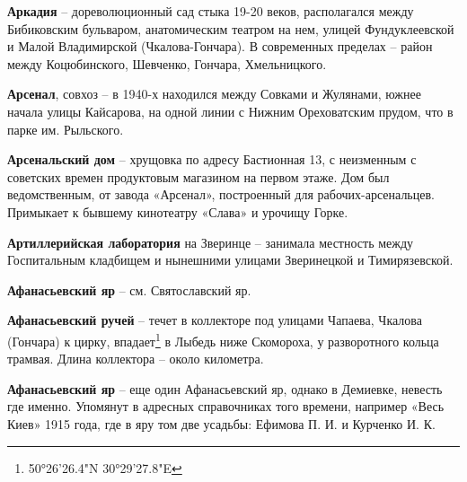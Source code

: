 \medskip


\textbf{Аркадия} – дореволюционный сад стыка 19-20 веков, располагался между Бибиковским бульваром, анатомическим театром на нем, улицей Фундуклеевской и Малой Владимирской (Чкалова-Гончара). В современных пределах – район между Коцюбинского, Шевченко, Гончара, Хмельницкого.\\ 

\medskip


\textbf{Арсенал}, совхоз – в 1940-х находился между Совками и Жулянами, южнее начала улицы Кайсарова, на одной линии с Нижним Ореховатским прудом, что в парке им. Рыльского.\\

\medskip


\textbf{Арсенальский дом} – хрущовка по адресу Бастионная 13, с неизменным с советских времен продуктовым магазином на первом этаже. Дом был ведомственным, от завода «Арсенал», построенный для рабочих-арсенальцев. Примыкает к бывшему кинотеатру «Слава» и урочищу Горке.\\

\medskip


\textbf{Артиллерийская лаборатория} на Зверинце – занимала местность между Госпитальным кладбищем и нынешними улицами Зверинецкой и Тимирязевской.\\

\medskip


\textbf{Афанасьевский яр} – см. Святославский яр.\\

\medskip


\textbf{Афанасьевский ручей} – течет в коллекторе под улицами Чапаева, Чкалова (Гончара) к цирку, впадает\footnote{50°26'26.4"N 30°29'27.8"E} в Лыбедь ниже Скомороха, у разворотного кольца трамвая. Длина коллектора – около километра.\\

\medskip


\textbf{Афанасьевский яр} – еще один Афанасьевский яр, однако в Демиевке, невесть где именно. Упомянут в адресных справочниках того времени, например «Весь Киев» 1915 года, где в яру том две усадьбы: Ефимова П. И. и Курченко И. К.
